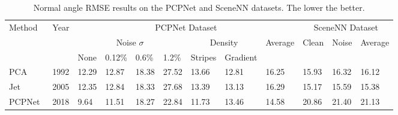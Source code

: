 \documentclass[sigconf]{acmart}
\begin{document}
\begin{table*}[t]
    \caption{Normal angle RMSE results on the PCPNet and SceneNN datasets. The lower the better.}
    \small
    \begin{tabular}{@{}l|c|lllllll|lll@{}}
    \toprule
        \multirow{3}{*}{Method} 
        & \multirow{3}{*}{Year} 
        & \multicolumn{7}{c|}{PCPNet Dataset}
        & \multicolumn{3}{c}{SceneNN Dataset}                              
        \\ 
        \cmidrule(l){3-12} 
        &
        & \multicolumn{4}{c|}{Noise $\sigma$}
        & \multicolumn{2}{c|}{Density}            
        & \multicolumn{1}{c|}{\multirow{2}{*}{Average}} 
        & \multicolumn{1}{c}{\multirow{2}{*}{Clean}} 
        & \multicolumn{1}{c|}{\multirow{2}{*}{Noise}} 
        & \multicolumn{1}{c}{\multirow{2}{*}{Average}} 
        \\ 
        \cmidrule(lr){3-8}
        &
        & None 
        & 0.12\% 
        & 0.6\% 
        & \multicolumn{1}{l|}{1.2\%} 
        & Stripes 
        & \multicolumn{1}{l|}{Gradient} 
        & \multicolumn{1}{c|}{}                         
        & \multicolumn{1}{c}{}                       
        & \multicolumn{1}{c|}{}                       
        & \multicolumn{1}{c}{}                         
        \\ 
        \midrule
        PCA~\cite{hoppe1992surface}
        & 1992
        & 12.29      
        & 12.87  
        & 18.38     
        & \multicolumn{1}{l|}{27.52}      
        &  13.66       
        & \multicolumn{1}{l|}{12.81}         
        & 16.25                     
        & 15.93                                     
        & \multicolumn{1}{l|}{16.32}            
        & 16.12    
        \\
        Jet~\cite{cazals2005estimating}
        & 2005
        & 12.35    
        & 12.84       
        & 18.33      
        & \multicolumn{1}{l|}{27.68}      
        & 13.39
        & \multicolumn{1}{l|}{13.13 }         
        & 16.29
        & 15.17
        & \multicolumn{1}{l|}{15.59}               
        & 15.38      
        \\
        PCPNet~\cite{guerrero2018pcpnet}
        & 2018
        & 9.64     
        & 11.51       
        & 18.27  
        & \multicolumn{1}{l|}{22.84}      
        & 11.73        
        & \multicolumn{1}{l|}{13.46}         
        &  14.58                                    
        & 20.86                                     
        & \multicolumn{1}{l|}{21.40}                
        & 21.13                                     

\end{tabular}
\end{table*}
\end{document}
